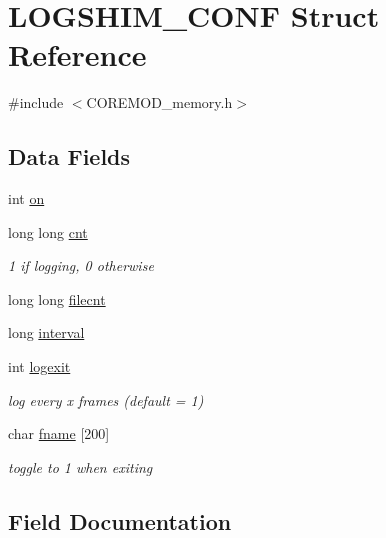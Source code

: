 \hypertarget{structLOGSHIM__CONF}{}\section{L\+O\+G\+S\+H\+I\+M\+\_\+\+C\+O\+N\+F Struct Reference}
\label{structLOGSHIM__CONF}


{\ttfamily \#include $<$C\+O\+R\+E\+M\+O\+D\+\_\+memory.\+h$>$}

\subsection*{Data Fields}
\begin{DoxyCompactItemize}
\item 
int \hyperlink{structLOGSHIM__CONF_a399b782abca4a24ae8e5a3c11ac9bc48}{on}
\item 
long long \hyperlink{structLOGSHIM__CONF_af89423462a4010b5213f9687f354a548}{cnt}
\begin{DoxyCompactList}\small\item\em 1 if logging, 0 otherwise \end{DoxyCompactList}\item 
long long \hyperlink{structLOGSHIM__CONF_a540e125719be22adb4d4d1c1c87f575d}{filecnt}
\item 
long \hyperlink{structLOGSHIM__CONF_af4a9410a1d66d15e10df76223aeccb50}{interval}
\item 
int \hyperlink{structLOGSHIM__CONF_ade9849e9a2d4a6973b891d0ba46724ed}{logexit}
\begin{DoxyCompactList}\small\item\em log every x frames (default = 1) \end{DoxyCompactList}\item 
char \hyperlink{structLOGSHIM__CONF_aa4b09441bd4b5c40b120b76c075d595d}{fname} \mbox{[}200\mbox{]}
\begin{DoxyCompactList}\small\item\em toggle to 1 when exiting \end{DoxyCompactList}\end{DoxyCompactItemize}


\subsection{Field Documentation}
\hypertarget{structLOGSHIM__CONF_af89423462a4010b5213f9687f354a548}{}
